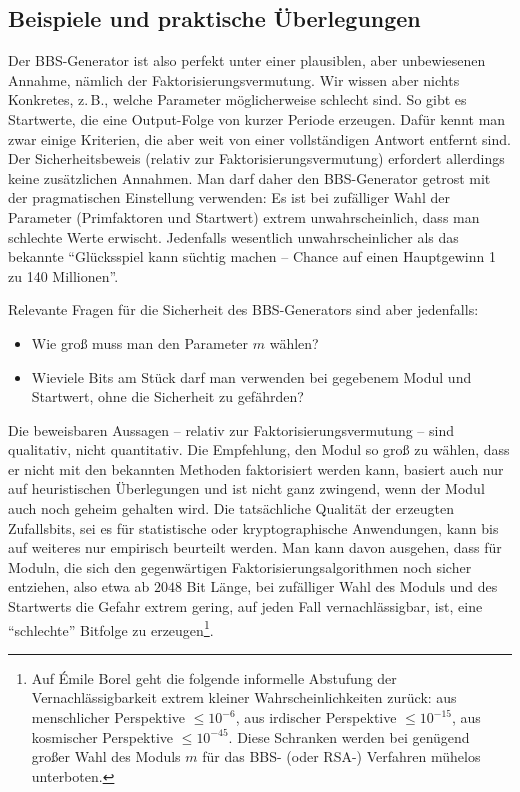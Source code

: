 \begin{refsegment}
\subsection{Beispiele und praktische Überlegungen}\label{ss-bool-perfbsp}

Der BBS-Generator ist also perfekt unter einer plausiblen, aber
unbewiesenen Annahme, nämlich der Faktorisierungsvermutung. Wir wissen aber
nichts Konkretes, z.\,B., welche Parameter möglicherweise schlecht sind.
So gibt es Startwerte, die eine Output-Folge von kurzer Periode erzeugen.
Dafür kennt man zwar einige Kriterien, die aber weit von einer vollständigen
Antwort entfernt sind.
Der Sicherheitsbeweis (relativ zur Faktorisierungsvermutung) erfordert allerdings
keine zusätzlichen Annahmen. Man darf daher den BBS-Generator
getrost mit der pragmatischen Einstellung verwenden: Es ist bei zufälliger
Wahl der Parameter (Primfaktoren und Startwert) extrem unwahrscheinlich,
dass man schlechte Werte erwischt. Jedenfalls wesentlich unwahrscheinlicher
als das bekannte "`Glücksspiel kann süchtig machen -- Chance auf einen Hauptgewinn
1 zu 140 Millionen"'.

Relevante Fragen für die Sicherheit des BBS-Generators
sind aber jedenfalls:
\begin{itemize}
  \item Wie groß muss man den Parameter $m$ wählen?
  \item Wieviele Bits am Stück darf man verwenden bei gegebenem Modul und
    Startwert, ohne die Sicherheit zu gefährden?
\end{itemize}

Die beweisbaren Aussagen -- relativ zur Faktorisierungsvermutung -- sind qualitativ,
nicht quantitativ. Die Empfehlung, den Modul so groß zu wählen, dass er
nicht mit den bekannten Methoden faktorisiert werden kann, basiert auch nur
auf heuristischen Überlegungen und ist nicht ganz zwingend, wenn der
Modul auch noch geheim gehalten wird. Die tatsächliche
Qualität der erzeugten Zufallsbits, sei es für statistische oder kryptographische
Anwendungen, kann bis auf weiteres nur empirisch beurteilt werden.
Man kann davon ausgehen, dass für Moduln, die sich den gegenwärtigen
Faktorisierungsalgorithmen noch sicher entziehen, also etwa ab $2048$ Bit
Länge, bei zufälliger Wahl des Moduls und des Startwerts die Gefahr extrem
gering, auf jeden Fall vernachlässigbar, ist, eine "`schlechte"' Bitfolge
zu erzeugen\footnote{%
  Auf Émile Borel geht die folgende informelle Abstufung der
  Vernachlässigbarkeit extrem kleiner Wahrscheinlichkeiten zurück:
  aus menschlicher Perspektive $\leq 10^{-6}$, aus irdischer Perspektive
  $\leq 10^{-15}$, aus kosmischer Perspektive $\leq 10^{-45}$. Diese
  Schranken werden bei genügend großer Wahl des Moduls $m$ für das
  BBS- (oder RSA-) Verfahren mühelos unterboten.
}.


\end{refsegment}
